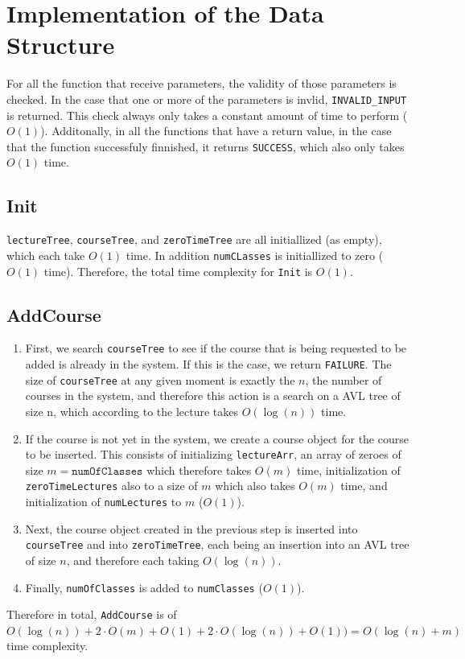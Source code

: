 \documentclass{article}
\begin{document}
\section*{Implementation of the Data Structure}
    For all the function that receive parameters, the validity of those parameters is checked. In the case that one
    or more of the parameters is invlid, \texttt{INVALID\_INPUT} is returned. This check always only takes a constant 
    amount of time to perform ($O(1)$). Additonally, in all the functions that have a return value, in the case
    that the function successfuly finnished, it returns \texttt{SUCCESS}, which also only takes $O(1)$ time.
    \subsection*{Init}
        \texttt{lectureTree}, \texttt{courseTree}, and \texttt{zeroTimeTree} are all initiallized (as empty), 
        which each take $O(1)$ time. In addition \texttt{numCLasses} is initiallized to zero ($O(1)$ time).
        Therefore, the total time complexity for \texttt{Init} is $O(1)$.
    \subsection*{AddCourse}
        \begin{enumerate}
            \item First, we search \texttt{courseTree} to see if the course that is being requested to be added
                is already in the system. If this is the case, we return \texttt{FAILURE}. The size of
                \texttt{courseTree} at any given moment is exactly the $n$, the number of courses in the 
                system, and therefore this action is a search on a AVL tree of size n, which according 
                to the lecture takes $O(\log(n))$ time.
            \item If the course is not yet in the system, we create a course object for the course to
                be inserted. This consists of initializing \texttt{lectureArr}, an array of zeroes of
                size $m=\texttt{numOfClasses}$ which therefore takes $O(m)$ time, initialization of 
                \texttt{zeroTimeLectures} also to a size of $m$ which also takes $O(m)$ time, and initialization
                of \texttt{numLectures} to $m$ ($O(1)$).
            \item Next, the course object created in the previous step is inserted into \texttt{courseTree} and
                into \texttt{zeroTimeTree}, each being an insertion into an AVL tree of size $n$, and therefore each 
                taking $O(\log(n))$.
            \item Finally, \texttt{numOfClasses} is added to \texttt{numClasses} ($O(1)$).
        \end{enumerate}
    Therefore in total, \texttt{AddCourse} is of $O(\log(n))+2\cdot O(m)+O(1)+2\cdot O(\log(n))+O(1))=O(\log(n)+m)$ time complexity.
\end{document}
